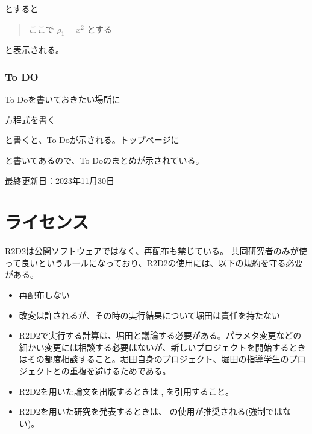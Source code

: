 \documentclass[letterpaper,10pt,dvipdfmx,report]{sphinxmanual}
\begin{document}
\sphinxAtStartPar
とすると
\begin{quote}

\sphinxAtStartPar
ここで \(\rho_1=x^2\) とする
\end{quote}

\sphinxAtStartPar
と表示される。


\subsection{To DO}
\label{\detokenize{sphinx:to-do}}
\sphinxAtStartPar
To Doを書いておきたい場所に

\begin{sphinxVerbatim}[commandchars=\\\{\}]
  方程式を書く
\end{sphinxVerbatim}

\sphinxAtStartPar
と書くと、To Doが示される。トップページに

\begin{sphinxVerbatim}[commandchars=\\\{\}]
\end{sphinxVerbatim}

\sphinxAtStartPar
と書いてあるので、To Doのまとめが示されている。

\sphinxAtStartPar
最終更新日：2023年11月30日


\chapter{ライセンス}
\label{\detokenize{index:id1}}
\sphinxAtStartPar
R2D2は公開ソフトウェアではなく、再配布も禁じている。
共同研究者のみが使って良いというルールになっており、R2D2の使用には、以下の規約を守る必要がある。
\begin{itemize}
\item {} 
\sphinxAtStartPar
再配布しない

\item {} 
\sphinxAtStartPar
改変は許されるが、その時の実行結果について堀田は責任を持たない

\item {} 
\sphinxAtStartPar
R2D2で実行する計算は、堀田と議論する必要がある。パラメタ変更などの細かい変更には相談する必要はないが、新しいプロジェクトを開始するときはその都度相談すること。堀田自身のプロジェクト、堀田の指導学生のプロジェクトとの重複を避けるためである。

\item {} 
\sphinxAtStartPar
R2D2を用いた論文を出版するときは ,  を引用すること。

\item {} 
\sphinxAtStartPar
R2D2を用いた研究を発表するときは、 の使用が推奨される(強制ではない)。

\end{itemize}
\end{document}
